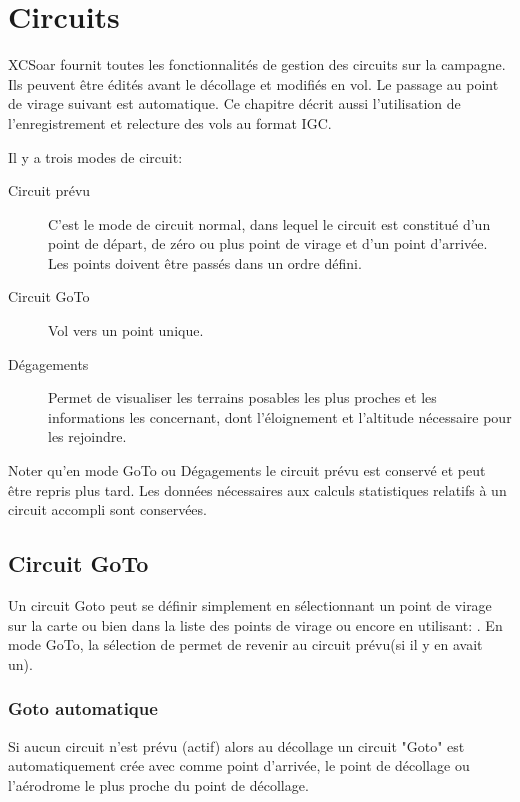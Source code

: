 \chapter{Circuits}\label{cha:tasks}

XCSoar fournit toutes les fonctionnalités de gestion des circuits sur la campagne. Ils peuvent être édités avant le décollage et modifiés en vol. Le passage au point de virage suivant est automatique. Ce chapitre décrit aussi l'utilisation de l'enregistrement et relecture des vols au format IGC.

Il y a trois modes de circuit:
\begin{description}
\item[Circuit prévu] C'est le mode de circuit normal, dans lequel le circuit est constitué d'un point de départ, de zéro ou plus point de virage et d'un point d'arrivée. Les points doivent être passés dans un ordre défini.
\item[Circuit GoTo] Vol vers un point unique.
\item[Dégagements] Permet de visualiser les terrains posables les plus proches et les informations les concernant, dont l'éloignement et l'altitude nécessaire pour les rejoindre.
\end{description}

Noter qu'en mode GoTo ou Dégagements le circuit prévu est conservé et peut être repris plus tard. Les données nécessaires aux calculs statistiques relatifs à un circuit accompli sont conservées.

\section{Circuit GoTo}\label{sec:Goto-tasks}

Un circuit Goto peut se définir simplement en sélectionnant un point de virage sur la carte ou bien dans la liste des points de virage ou encore en utilisant:  \blink{}
.  En mode GoTo, la sélection de
\blink{} permet de revenir au circuit prévu(si il y en avait un).

\subsection*{Goto automatique}

Si aucun circuit n'est prévu (actif) alors au décollage un circuit "Goto" est automatiquement crée avec comme point d'arrivée, le point de décollage ou l'aérodrome le plus proche du point de décollage.

